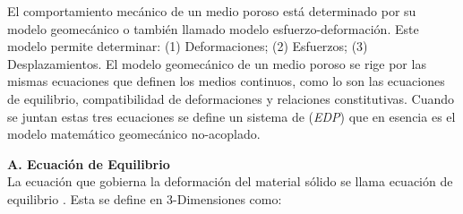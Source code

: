 El comportamiento mecánico de un medio poroso está determinado por su modelo geomecánico o también llamado modelo esfuerzo-deformación. Este modelo permite determinar: (1) Deformaciones; (2) Esfuerzos; (3) Desplazamientos. El modelo geomecánico de un medio poroso se rige por las mismas ecuaciones que definen los medios continuos, como lo son las ecuaciones de equilibrio, compatibilidad de deformaciones y relaciones constitutivas. Cuando se juntan estas tres ecuaciones se define un sistema de (\textit{EDP}) que en esencia es el modelo matemático geomecánico no-acoplado.\bigskip


\textbf{A. Ecuación de Equilibrio}
\\
La ecuación que gobierna la deformación del material sólido se llama ecuación de equilibrio \cite{Shabana2018ComputationalMechanics}. Esta se define en 3-Dimensiones como:

